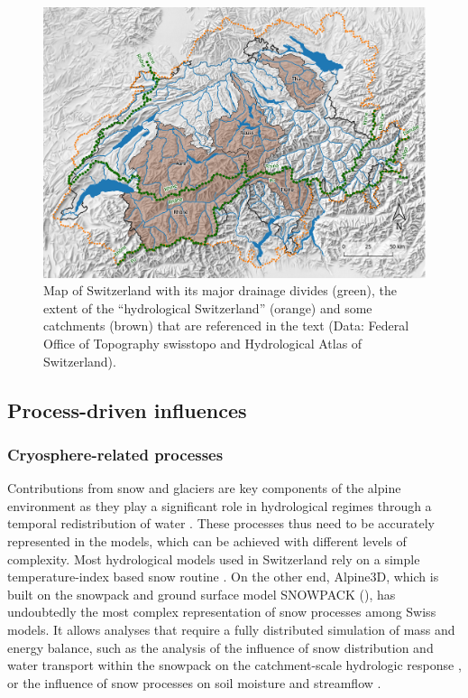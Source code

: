 \documentclass[10pt,a4paper]{article}
\begin{document}
\begin{figure}[htb]
	\begin{center}
		\includegraphics[width=0.95\columnwidth]{figures/map}
		\caption{{Map of Switzerland with its major drainage divides (green), the extent of the ``hydrological Switzerland'' (orange) and some catchments (brown) that are referenced in the text (Data: Federal Office of Topography swisstopo and Hydrological Atlas of Switzerland). \label{fig:map}
		}}
	\end{center}
\end{figure}


\subsection{Process-driven influences}
\label{sec:context:processes}


\subsubsection{Cryosphere-related processes}
\label{sec:context:cryosphere}

Contributions from snow and glaciers are key components of the alpine environment as they play a significant role in hydrological regimes through a temporal redistribution of water \citep{Barnett2005}. These processes thus need to be accurately represented in the models, which can be achieved with different levels of complexity. Most hydrological models used in Switzerland rely on a simple temperature-index based snow routine \citep[see for example][]{Jenicek2018}. On the other end, Alpine3D, which is built on the snowpack and ground surface model SNOWPACK (\citealt{Bartelt2002, Lehning2002a, Lehning2002b}), has undoubtedly the most complex representation of snow processes among Swiss models. It allows analyses that require a fully distributed simulation of mass and energy balance, such as the analysis of the influence of snow distribution and water transport within the snowpack on the catchment-scale hydrologic response \citep{Brauchli2017}, or the influence of snow processes on soil moisture and streamflow \citep{Wever2017}.
\end{document}
